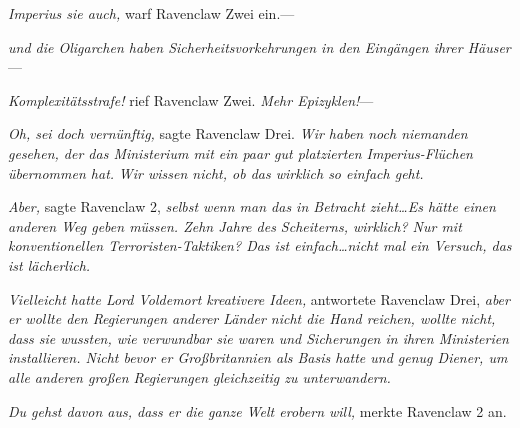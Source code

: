 \emph{Imperius sie auch,} warf Ravenclaw Zwei ein.—

\emph{und die Oligarchen haben Sicherheitsvorkehrungen in den Eingängen ihrer Häuser}—

\emph{Komplexitätsstrafe!} rief Ravenclaw Zwei. \emph{Mehr Epizyklen!}—

\emph{Oh, sei doch vernünftig,} sagte Ravenclaw Drei. \emph{Wir haben noch niemanden gesehen, der das Ministerium mit ein paar gut platzierten Imperius-Flüchen übernommen hat.} \emph{Wir wissen nicht, ob das wirklich so einfach geht.}

\emph{Aber,} sagte Ravenclaw 2, \emph{selbst wenn man das in Betracht zieht…Es hätte einen anderen Weg geben müssen. Zehn Jahre des Scheiterns, wirklich? Nur mit konventionellen Terroristen-Taktiken? Das ist einfach…nicht mal ein Versuch, das ist lächerlich.}

\emph{Vielleicht hatte Lord Voldemort kreativere Ideen,} antwortete Ravenclaw Drei, \emph{aber er wollte den Regierungen anderer Länder nicht die Hand reichen, wollte nicht, dass sie wussten, wie verwundbar sie waren und Sicherungen in ihren Ministerien installieren. Nicht bevor er Großbritannien als Basis hatte und genug Diener, um alle anderen großen Regierungen gleichzeitig zu unterwandern.}

\emph{Du gehst davon aus, dass er die ganze Welt erobern will,} merkte Ravenclaw 2 an.

